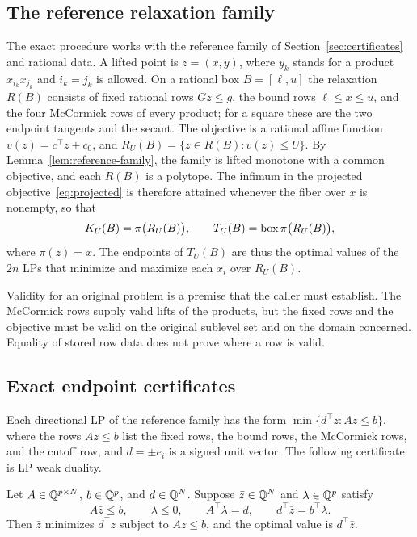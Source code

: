\subsection{The reference relaxation family}\label{sec:algorithms-family}

The exact procedure works with the reference family of
Section~\ref{sec:certificates} and rational data. A lifted point is
$z=(x,y)$, where $y_k$ stands for a product $x_{i_k}x_{j_k}$ and $i_k=j_k$ is
allowed. On a rational box $B=[\ell,u]$ the relaxation $R(B)$ consists of
fixed rational rows $Gz\le g$, the bound rows $\ell\le x\le u$, and the four
McCormick rows of every product; for a square these are the two endpoint
tangents and the secant. The objective is a rational affine function
$v(z)=c^\top z+c_0$, and $R_U(B)=\{z\in R(B):v(z)\le U\}$. By
Lemma~\ref{lem:reference-family}, the family is lifted monotone with a common
objective, and each $R(B)$ is a polytope. The infimum in the projected
objective~\eqref{eq:projected} is therefore attained whenever the fiber over
$x$ is nonempty, so that
\begin{equation}\label{eq:ref-projection}
 K_U(B)=\pi\bigl(R_U(B)\bigr),\qquad
 T_U(B)=\operatorname{box}\pi\bigl(R_U(B)\bigr),
\end{equation}
where $\pi(z)=x$. The endpoints of $T_U(B)$ are thus the optimal values of the
$2n$ LPs that minimize and maximize each $x_i$ over $R_U(B)$.

Validity for an original problem is a premise that the caller must
establish. The McCormick rows supply valid lifts of the products, but the
fixed rows and the objective must be valid on the original sublevel set and
on the domain concerned. Equality of stored row data does not prove where a
row is valid.

\subsection{Exact endpoint certificates}\label{sec:algorithms-lp}

Each directional LP of the reference family has the form
$\min\{d^\top z:Az\le b\}$, where the rows $Az\le b$ list the fixed rows, the
bound rows, the McCormick rows, and the cutoff row, and $d=\pm e_i$ is a signed
unit vector. The following certificate is LP weak duality.

\begin{lemma}\label{lem:lp-certificate}
Let $A\in\mathbb{Q}^{p\times N}$, $b\in\mathbb{Q}^p$, and $d\in\mathbb{Q}^N$. Suppose
$\bar z\in\mathbb{Q}^N$ and $\lambda\in\mathbb{Q}^p$ satisfy
\begin{equation}\label{eq:lp-certificate}
 A\bar z\le b,\qquad \lambda\le0,\qquad A^\top\lambda=d,\qquad
 d^\top\bar z=b^\top\lambda .
\end{equation}
Then $\bar z$ minimizes $d^\top z$ subject to $Az\le b$, and the optimal
value is $d^\top\bar z$.
\end{lemma}

